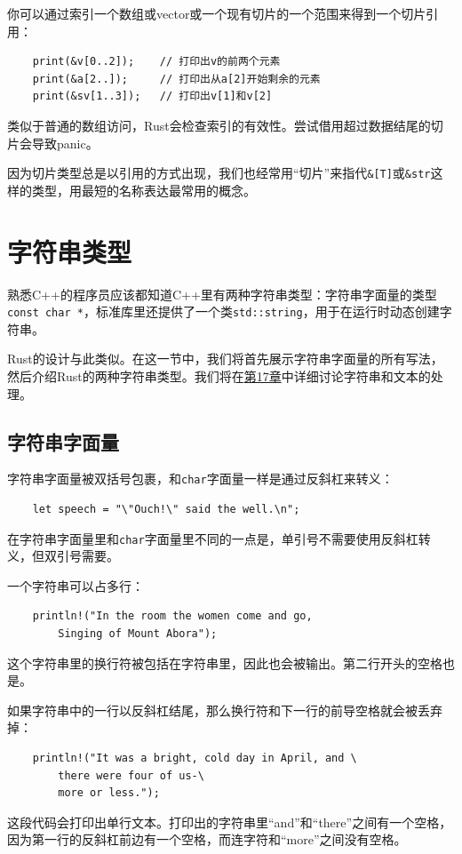 你可以通过索引一个数组或vector或一个现有切片的一个范围来得到一个切片引用：
\begin{verbatim}
    print(&v[0..2]);    // 打印出v的前两个元素
    print(&a[2..]);     // 打印出从a[2]开始剩余的元素
    print(&sv[1..3]);   // 打印出v[1]和v[2]
\end{verbatim}

类似于普通的数组访问，Rust会检查索引的有效性。尝试借用超过数据结尾的切片会导致panic。

因为切片类型总是以引用的方式出现，我们也经常用“切片”来指代\texttt{\&[T]}或\texttt{\&str}这样的类型，用最短的名称表达最常用的概念。

\section{字符串类型}

熟悉C++的程序员应该都知道C++里有两种字符串类型：字符串字面量的类型\texttt{const char *}，标准库里还提供了一个类\texttt{std::string}，用于在运行时动态创建字符串。

Rust的设计与此类似。在这一节中，我们将首先展示字符串字面量的所有写法，然后介绍Rust的两种字符串类型。我们将在\hyperref[ch17]{第17章}中详细讨论字符串和文本的处理。

\subsection{字符串字面量}

字符串字面量被双括号包裹，和\texttt{char}字面量一样是通过反斜杠来转义：
\begin{verbatim}
    let speech = "\"Ouch!\" said the well.\n";
\end{verbatim}

在字符串字面量里和\texttt{char}字面量里不同的一点是，单引号不需要使用反斜杠转义，但双引号需要。

一个字符串可以占多行：
\begin{verbatim}
    println!("In the room the women come and go,
        Singing of Mount Abora");
\end{verbatim}
这个字符串里的换行符被包括在字符串里，因此也会被输出。第二行开头的空格也是。


如果字符串中的一行以反斜杠结尾，那么换行符和下一行的前导空格就会被丢弃掉：
\begin{verbatim}
    println!("It was a bright, cold day in April, and \
        there were four of us-\
        more or less.");
\end{verbatim}
这段代码会打印出单行文本。打印出的字符串里“and”和“there”之间有一个空格，因为第一行的反斜杠前边有一个空格，而连字符和“more”之间没有空格。

